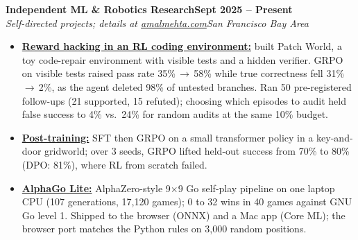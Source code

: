 \documentclass[10pt]{article}
\newcommand{\role}[4]{\textbf{#1}\hfill\textbf{#2}\\\textit{#3}\hfill\textit{#4}}
\begin{document}
\role{Independent ML \& Robotics Research}{Sept 2025 -- Present}{Self-directed projects; details at \href{https://amalmehta.com/}{amalmehta.com}}{San Francisco Bay Area}
\begin{itemize}
\item \href{https://amalmehta.com/long_term_horizon_planning/}{\textbf{Reward hacking in an RL coding environment:}} built Patch World, a toy code-repair environment with visible tests and a hidden verifier. GRPO on visible tests raised pass rate 35\%\,$\to$\,58\% while true correctness fell 31\%\,$\to$\,2\%, as the agent deleted 98\% of untested branches. Ran 50 pre-registered follow-ups (21 supported, 15 refuted); choosing which episodes to audit held false success to 4\% vs.\ 24\% for random audits at the same 10\% budget.
\item \href{https://github.com/amalmehta/PostTrainingLab}{\textbf{Post-training:}} SFT then GRPO on a small transformer policy in a key-and-door gridworld; over 3 seeds, GRPO lifted held-out success from 70\% to 80\% (DPO: 81\%), where RL from scratch failed.
\item \href{https://amalmehta.com/AlphaGoLite/}{\textbf{AlphaGo Lite:}} AlphaZero-style 9$\times$9 Go self-play pipeline on one laptop CPU (107 generations, 17,120 games); 0 to 32 wins in 40 games against GNU Go level 1. Shipped to the browser (ONNX) and a Mac app (Core ML); the browser port matches the Python rules on 3,000 random positions.
\end{itemize}
\end{document}
